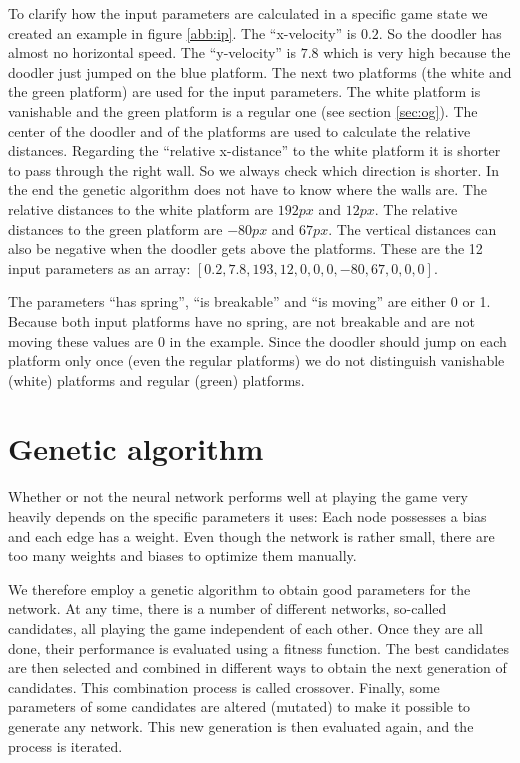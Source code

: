 \documentclass[a4paper,12pt,pagesize,headsepline,bibtotoc,titlepage,abstracton]{scrartcl}
\begin{document}
To clarify how the input parameters are calculated in a specific game state we created an example in figure \ref{abb:ip}. The ``x-velocity'' is $0.2$. So the doodler has almost no horizontal speed. The ``y-velocity'' is $7.8$ which is very high because the doodler just jumped on the blue platform. The next two platforms (the white and the green platform) are used for the input parameters. The white platform is vanishable and the green platform is a regular one (see section \ref{sec:og}). The center of the doodler and of the platforms are used to calculate the relative distances. Regarding the ``relative x-distance'' to the white platform it is shorter to pass through the right wall. So we always check which direction is shorter. In the end the genetic algorithm does not have to know where the walls are. The relative distances to the white platform are $192px$ and $12px$. The relative distances to the green platform are $-80px$ and $67px$. The vertical distances can also be negative when the doodler gets above the platforms. These are the 12 input parameters as an array: $[0.2, 7.8, 193, 12, 0, 0, 0, -80, 67, 0, 0, 0]$.

The parameters ``has spring'', ``is breakable'' and ``is moving'' are either 0 or 1. Because both input platforms have no spring, are not breakable and are not moving these values are 0 in the example. Since the doodler should jump on each platform only once (even the regular platforms) we do not distinguish vanishable (white) platforms and regular (green) platforms.

\section{Genetic algorithm}
\label{sec:ga}

Whether or not the neural network performs well at playing the game very heavily depends on the specific parameters it uses: Each node possesses a bias and each edge has a weight. Even though the network is rather small, there are too many weights and biases to optimize them manually. 

We therefore employ a genetic algorithm to obtain good parameters for the network. At any time, there is a number of different networks, so-called candidates, all playing the game independent of each other. Once they are all done, their performance is evaluated using a fitness function. The best candidates are then selected and combined in different ways to obtain the next generation of candidates. This combination process is called crossover. Finally, some parameters of some candidates are altered (mutated) to make it possible to generate any network. This new generation is then evaluated again, and the process is iterated.
\end{document}
